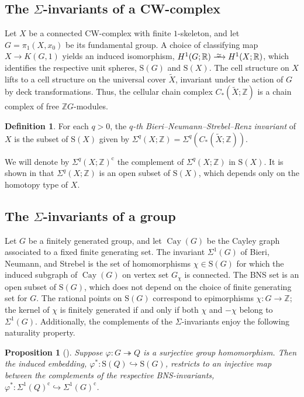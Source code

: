 \documentclass[11pt]{amsart}
\newtheorem{proposition}[theorem]{Proposition}
\theoremstyle{definition}
\newtheorem{definition}[theorem]{Definition}
\newcommand{\Z}{\mathbb{Z}}
\newcommand{\R}{\mathbb{R}}
\newcommand{\rS}{\mathrm{S}}
\DeclareMathOperator{\Cay}{Cay}
\newcommand{\surj}{\twoheadrightarrow}
\newcommand{\inj}{\hookrightarrow}
\newcommand\isom{\xrightarrow{ \,\smash{\raisebox{-0.6ex}{\ensuremath{\scriptstyle\simeq}}}\,}}
\newcommand{\compl}{\mathrm{c}}
\newcommand{\wX}{\widetilde{X}}
\begin{document}
\subsection{The \texorpdfstring{$\Sigma$}{Sigma}-invariants of a CW-complex}
\label{subsec:fgs cw}
Let $X$ be a connected CW-complex with 
finite $1$-skeleton, and let $G=\pi_1(X,x_0)$ be its fundamental 
group.  A choice of classifying map $X\to K(G,1)$ yields   
an induced isomorphism, $H^1(G;\R) \isom H^1(X;\R)$, 
which identifies the respective unit spheres, 
$\rS(G)$ and $\rS(X)$.  The cell structure on $X$ lifts to a 
cell structure on the universal cover $\wX$, invariant under the 
action of $G$ by deck transformations. 
Thus, the cellular chain complex $C_*(\wX;\Z)$ 
is a chain complex of free $\Z{G}$-modules.  

\begin{definition}
\label{def:fgs cw}
For each $q> 0$, the {\em $q$-th 
Bieri--Neumann--Strebel--Renz invariant}\/ 
of $X$ is the subset of $\rS(X)$ given by
$\Sigma^q(X;\Z)=\Sigma^q(C_*(\wX;\Z))$.
\end{definition}

We will denote by $\Sigma^q(X;\Z)^{\compl}$ the complement 
of $\Sigma^q(X;\Z)$ in $\rS(X)$.  It is shown in \cite{FGS} that 
$\Sigma^q(X;\Z)$ is an open subset of $\rS(X)$, which depends 
only on the homotopy type of $X$. 

\subsection{The \texorpdfstring{$\Sigma$}{Sigma}-invariants of a group}
\label{subsec:sigma-groups} 

Let $G$ be a finitely generated group, and let $\Cay(G)$ be the Cayley 
graph associated to a fixed finite generating set. The invariant $\Sigma^1(G)$ 
of Bieri, Neumann, and Strebel \cite{BNS} is the set of homomorphisms 
$\chi\in \rS(G)$ for which the induced subgraph of $\Cay(G)$ on vertex 
set $G_{\chi}$ is connected. The BNS set is an open subset of $\rS(G)$, 
which does not depend on the choice of finite generating set for $G$. 
The rational points on $\rS(G)$ correspond to epimorphisms 
$\chi\colon G\to \Z$; the kernel of $\chi$ is 
finitely generated if and only if both $\chi$ and $-\chi$ belong to $\Sigma^1(G)$. 
Additionally, the complements of the $\Sigma$-invariants enjoy 
the following naturality property.  

\begin{proposition}[\cite{BNS}] 
\label{prop:sigma1-nat}
Suppose $\varphi\colon G\surj Q$ is a 
surjective group homomorphism. Then the induced embedding, 
$\varphi^*\colon \rS(Q)\inj \rS(G)$, restricts to an injective map 
between the complements of the respective BNS-invariants,
$\varphi^*\colon \Sigma^1(Q)^{\compl} \inj  \Sigma^1(G)^{\compl}$.
\end{proposition}
\end{document}

